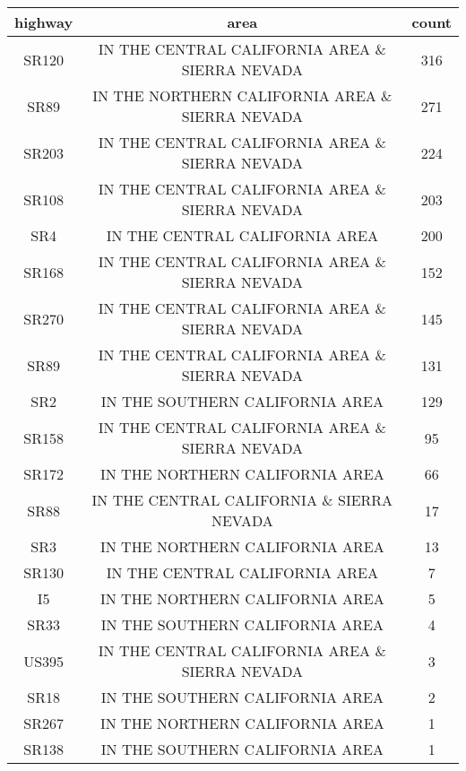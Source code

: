 \documentclass[12pt]{article}
\begin{document}
\begin{center}
        \hspace*{-4cm}
        \begin{tabular}{c|c|c}
                highway & area & count\\
                \hline
                SR120 & IN THE CENTRAL CALIFORNIA AREA \& SIERRA NEVADA & 316\\
                SR89  & IN THE NORTHERN CALIFORNIA AREA \& SIERRA NEVADA & 271\\
                SR203 & IN THE CENTRAL CALIFORNIA AREA \& SIERRA NEVADA & 224\\
                SR108 & IN THE CENTRAL CALIFORNIA AREA \& SIERRA NEVADA & 203\\
                SR4 & IN THE CENTRAL CALIFORNIA AREA & 200\\
                SR168 & IN THE CENTRAL CALIFORNIA AREA \& SIERRA NEVADA & 152\\
                SR270 & IN THE CENTRAL CALIFORNIA AREA \& SIERRA NEVADA & 145\\
                SR89 & IN THE CENTRAL CALIFORNIA AREA \& SIERRA NEVADA & 131\\
                SR2 & IN THE SOUTHERN CALIFORNIA AREA &   129\\
                SR158 & IN THE CENTRAL CALIFORNIA AREA \& SIERRA NEVADA  & 95\\
                SR172 & IN THE NORTHERN CALIFORNIA AREA & 66\\
                SR88 & IN THE CENTRAL CALIFORNIA \& SIERRA NEVADA & 17\\
                SR3 & IN THE NORTHERN CALIFORNIA AREA & 13\\
                SR130 & IN THE CENTRAL CALIFORNIA AREA & 7\\
                I5 & IN THE NORTHERN CALIFORNIA AREA & 5\\
                SR33 & IN THE SOUTHERN CALIFORNIA AREA & 4\\
                US395 & IN THE CENTRAL CALIFORNIA AREA \& SIERRA NEVADA & 3\\
                SR18 & IN THE SOUTHERN CALIFORNIA AREA & 2\\
                SR267 & IN THE NORTHERN CALIFORNIA AREA & 1\\
                SR138 & IN THE SOUTHERN CALIFORNIA AREA & 1
        \end{tabular}
        \hspace*{-4cm}
\end{center}
\end{document}
